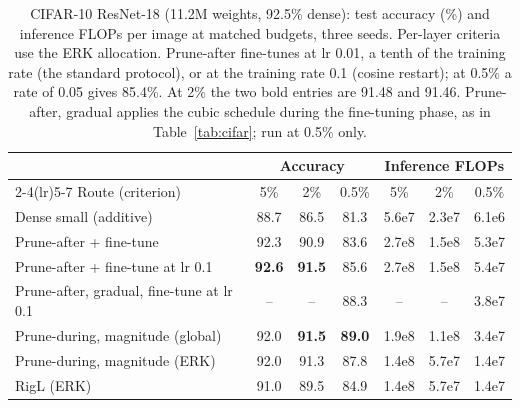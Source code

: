 \documentclass[11pt]{article}
\begin{document}
\begin{table}[t]
\centering\small
\caption{CIFAR-10 ResNet-18 (11.2M weights, 92.5\% dense): test accuracy (\%) and inference FLOPs per image at matched
budgets, three seeds. Per-layer criteria use the ERK allocation. Prune-after fine-tunes at lr 0.01, a tenth of the training
rate (the standard protocol), or at the training rate 0.1 (cosine restart); at 0.5\% a rate of 0.05 gives 85.4\%. At 2\%
the two bold entries are 91.48 and 91.46. Prune-after, gradual applies the cubic schedule during the fine-tuning phase,
as in Table~\ref{tab:cifar}; run at 0.5\% only.}
\label{tab:resnet}
\begin{tabular}{lcccccc}
\toprule
 & \multicolumn{3}{c}{Accuracy} & \multicolumn{3}{c}{Inference FLOPs} \\
\cmidrule(lr){2-4}\cmidrule(lr){5-7}
Route (criterion) & 5\% & 2\% & 0.5\% & 5\% & 2\% & 0.5\% \\
\midrule
Dense small (additive)           & 88.7 & 86.5 & 81.3 & 5.6e7 & 2.3e7 & 6.1e6 \\
Prune-after + fine-tune          & 92.3 & 90.9 & 83.6 & 2.7e8 & 1.5e8 & 5.3e7 \\
Prune-after + fine-tune at lr 0.1 & \textbf{92.6} & \textbf{91.5} & 85.6 & 2.7e8 & 1.5e8 & 5.4e7 \\
Prune-after, gradual, fine-tune at lr 0.1 & -- & -- & 88.3 & -- & -- & 3.8e7 \\
Prune-during, magnitude (global) & 92.0 & \textbf{91.5} & \textbf{89.0} & 1.9e8 & 1.1e8 & 3.4e7 \\
Prune-during, magnitude (ERK)    & 92.0 & 91.3 & 87.8 & 1.4e8 & 5.7e7 & 1.4e7 \\
RigL (ERK)                       & 91.0 & 89.5 & 84.9 & 1.4e8 & 5.7e7 & 1.4e7 \\
\bottomrule
\end{tabular}
\end{table}
\end{document}
